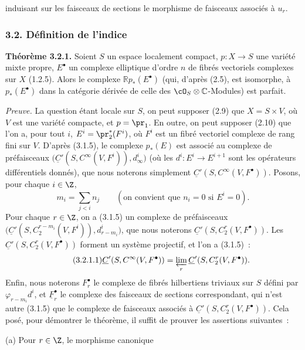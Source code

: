 induisant sur les faisceaux de sections le morphisme de faisceaux associés à $u_r$.

\subsubsection*{3.2. Définition de l'indice}
\textbf{Théorème 3.2.1.} Soient $S$ un espace localement compact, $p:X\to S$ une variété mixte propre, $E^\bullet$ un complexe elliptique d'ordre $n$ de fibrés vectoriels complexes sur $X$ (1.2.5). Alors le complexe $\mathbb{R}p_*(E^\bullet)$ (qui, d'après (2.5), est isomorphe, à $p_*(E^\bullet)$ dans la catégorie dérivée de celle des $\cO_S\otimes\mathbb C$-Modules) est parfait.

\emph{Preuve.} La question étant locale sur $S$, on peut supposer (2.9) que $X=S\times V$, où $V$ est une variété compacte, et $p=\pr_1$. En outre, on peut supposer (2.10) que l'on a, pour tout $i$, $E^i=\pr_2^*(F^i)$, où $F^i$ est un fibré vectoriel complexe de rang fini sur $V$. D'après (3.1.5), le complexe $p_*(E)$ est associé au complexe de préfaisceaux $\bigl(\underline C'(S,C^\infty(V,F^i)),d_\infty^i\bigr)$ (où les $d^i:E^i\longrightarrow E^{i+1}$ sont les opérateurs différentiels donnés), que nous noterons simplement $\underline C'(S,C^\infty(V,F^\bullet))$. Posons, pour chaque $i\in\Z$,
\[
  m_i=\sum_{j<i} n_j
  \qquad (\text{on convient que } n_i=0 \text{ si } E^i=0).
\]
Pour chaque $r\in\Z$, on a (3.1.5) un complexe de préfaisceaux $\bigl(\underline C'(S,C_2^{r-m_i}(V,F^i)),d_{r-m_i}^i\bigr)$, que nous noterons $\underline C'(S,C_2^r(V,F^\bullet))$.
Les $\underline C'(S,C_2^r(V,F^\bullet))$ forment un système projectif, et l'on a (3.1.5)~:
\begin{equation}\tag{3.2.1.1}
  \underline C'(S,C^\infty(V,F^\bullet))=\varprojlim_r \underline C'(S,C_2^r(V,F^\bullet)).
\end{equation}
Enfin, nous noterons $F_r^\bullet$ le complexe de fibrés hilbertiens triviaux sur $S$ défini par $\varphi_{r-m_i}d^i$, et $\underline F_r^\bullet$ le complexe des faisceaux de sections correspondant, qui n'est autre (3.1.5) que le complexe de faisceaux associés à $\underline C'(S,C_2^r(V,F^\bullet))$. Cela posé, pour démontrer le théorème, il suffit de prouver les assertions suivantes~:

(a) Pour $r\in\Z$, le morphisme canonique
